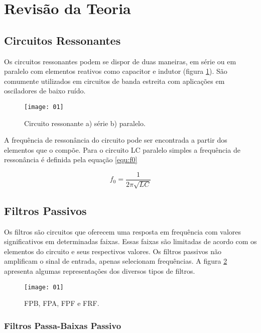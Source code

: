 \newpage
\section{Revisão da Teoria}

\subsection{Circuitos Ressonantes}

Os circuitos ressonantes podem se dispor de duas maneiras, em série ou em 
paralelo com elementos reativos como capacitor e indutor (figura \ref{fig:01}). 
São comumente 
utilizados em circuitos de banda estreita com aplicações em osciladores de 
baixo ruído.

\begin{figure}[H]
  \centering
  \caption{Circuito ressonante a) série b) paralelo.}
  \texttt{[image: 01]}
  
  \label{fig:01}
\end{figure}

A frequência de ressonância do circuito pode ser encontrada a partir dos 
elementos que o compõe. Para o circuito LC paralelo simples a frequência de 
ressonância é definida pela equação \ref{equ:f0}

\begin{equation}
  \label{equ:f0}
 f_0 = \frac{1}{2 \pi \sqrt{LC}}
\end{equation}

\subsection{Filtros Passivos}

Os filtros são circuitos que oferecem uma resposta em frequência com valores 
significativos em determinadas faixas.  Essas faixas são limitadas de acordo 
com os elementos do circuito e seus respectivos valores.
Os filtros passivos não amplificam o sinal de entrada, apenas selecionam 
frequências. A figura \ref{fig:02} apresenta algumas representações dos 
diversos tipos de filtros.

\begin{figure}[H]
  \centering
  \caption{ FPB, FPA, FPF e FRF.}
  \texttt{[image: 01]}
  
  \label{fig:02}
\end{figure}


\subsubsection{Filtros Passa-Baixas Passivo}

